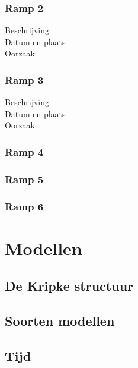\documentclass{article}
\begin{document}
	\subsubsection{Ramp 2}
	\begin{description}
		\item[Beschrijving]
		\item[Datum en plaats] 
		\item[Oorzaak]
	\end{description}
	
	\subsubsection{Ramp 3}
	\begin{description}
		\item[Beschrijving]
		\item[Datum en plaats] 
		\item[Oorzaak]
	\end{description}
	
	\subsubsection{Ramp 4}
	\subsubsection{Ramp 5}
	\subsubsection{Ramp 6}
	
	

	\section{Modellen}
	
	\subsection{De Kripke structuur}
	
	\subsection{Soorten modellen}
	
	\subsection{Tijd}
	
\end{document}
